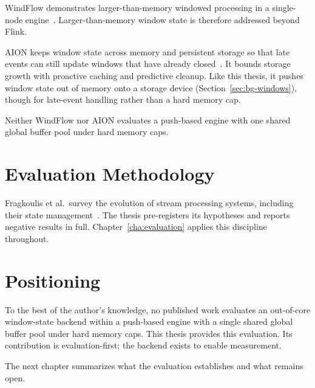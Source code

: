 WindFlow demonstrates larger-than-memory windowed processing in a single-node engine~\cite{frassinelli2025}.
Larger-than-memory window state is therefore addressed beyond Flink.

AION keeps window state across memory and persistent storage so that late
events can still update windows that have already closed~\cite{esteves2020}.
It bounds storage growth with proactive caching and predictive cleanup.
Like this thesis, it pushes window state out of memory onto a storage device
(Section~\ref{sec:bg-windows}), though for late-event handling rather than a hard memory cap.

Neither WindFlow nor AION evaluates a push-based engine with one shared global buffer pool under hard memory caps.

\section{Evaluation Methodology\label{sec:rel-method}}

Fragkoulis et al.\ survey the evolution of stream processing systems, including their state management~\cite{fragkoulis2024}.
The thesis pre-registers its hypotheses and reports negative results in full.
Chapter~\ref{cha:evaluation} applies this discipline throughout.

\section{Positioning\label{sec:rel-positioning}}

To the best of the author's knowledge, no published work evaluates an out-of-core window-state backend within a push-based engine with a single shared global buffer pool under hard memory caps.
This thesis provides this evaluation.
Its contribution is evaluation-first; the backend exists to enable measurement.

The next chapter summarizes what the evaluation establishes and what remains open.
